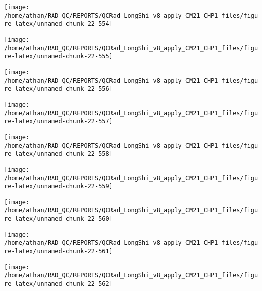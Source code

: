 \documentclass[
  10pt,
  a4paper,oneside]{article}
\begin{document}
\begin{center}\texttt{[image: /home/athan/RAD\_QC/REPORTS/QCRad\_LongShi\_v8\_apply\_CM21\_CHP1\_files/figure-latex/unnamed-chunk-22-554]} \end{center}

\begin{center}\texttt{[image: /home/athan/RAD\_QC/REPORTS/QCRad\_LongShi\_v8\_apply\_CM21\_CHP1\_files/figure-latex/unnamed-chunk-22-555]} \end{center}

\begin{center}\texttt{[image: /home/athan/RAD\_QC/REPORTS/QCRad\_LongShi\_v8\_apply\_CM21\_CHP1\_files/figure-latex/unnamed-chunk-22-556]} \end{center}

\begin{center}\texttt{[image: /home/athan/RAD\_QC/REPORTS/QCRad\_LongShi\_v8\_apply\_CM21\_CHP1\_files/figure-latex/unnamed-chunk-22-557]} \end{center}

\begin{center}\texttt{[image: /home/athan/RAD\_QC/REPORTS/QCRad\_LongShi\_v8\_apply\_CM21\_CHP1\_files/figure-latex/unnamed-chunk-22-558]} \end{center}

\begin{center}\texttt{[image: /home/athan/RAD\_QC/REPORTS/QCRad\_LongShi\_v8\_apply\_CM21\_CHP1\_files/figure-latex/unnamed-chunk-22-559]} \end{center}

\begin{center}\texttt{[image: /home/athan/RAD\_QC/REPORTS/QCRad\_LongShi\_v8\_apply\_CM21\_CHP1\_files/figure-latex/unnamed-chunk-22-560]} \end{center}

\begin{center}\texttt{[image: /home/athan/RAD\_QC/REPORTS/QCRad\_LongShi\_v8\_apply\_CM21\_CHP1\_files/figure-latex/unnamed-chunk-22-561]} \end{center}

\begin{center}\texttt{[image: /home/athan/RAD\_QC/REPORTS/QCRad\_LongShi\_v8\_apply\_CM21\_CHP1\_files/figure-latex/unnamed-chunk-22-562]} \end{center}
\end{document}
